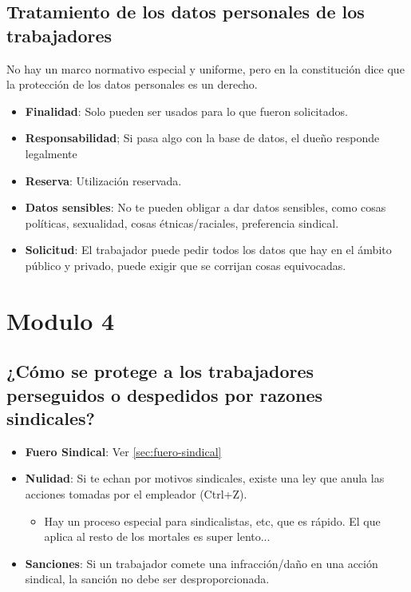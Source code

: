 \documentclass[spanish,12pt,a4paper,titlepage]{report}
\begin{document}
\subsection{Tratamiento de los datos personales de los trabajadores}

No hay un marco normativo especial y uniforme, pero en la constitución dice que la protección de los datos personales es un derecho.

\begin{itemize}
\item \textbf{Finalidad}: Solo pueden ser usados para lo que fueron solicitados.
\item \textbf{Responsabilidad}; Si pasa algo con la base de datos, el dueño responde legalmente
\item \textbf{Reserva}: Utilización reservada.
\item \textbf{Datos sensibles}: No te pueden obligar a dar datos sensibles, como cosas políticas, sexualidad, cosas étnicas/raciales, preferencia sindical.
\item \textbf{Solicitud}: El trabajador puede pedir todos los datos que hay en el ámbito público y privado, puede exigir que se corrijan cosas equivocadas.
\end{itemize}

\section{Modulo 4}

\subsection{¿Cómo se protege a los trabajadores perseguidos o despedidos por razones sindicales?}

\begin{itemize}
\item \textbf{Fuero Sindical}: Ver \ref{sec:fuero-sindical}
\item \textbf{Nulidad}: Si te echan por motivos sindicales, existe una ley que anula las acciones tomadas por el empleador (Ctrl+Z).
  \begin{itemize}
  \item Hay un proceso especial para sindicalistas, etc, que es rápido. El que aplica al resto de los mortales es super lento...
  \end{itemize}
\item \textbf{Sanciones}: Si un trabajador comete una infracción/daño en una acción sindical, la sanción no debe ser desproporcionada.
\end{itemize}
\end{document}
